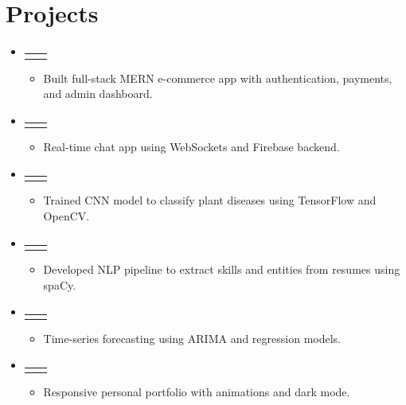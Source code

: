 \documentclass[a4paper,10pt]{article}
\makeatletter
\newcommand{\resumeItem}[1]{
  \item\small{#1 \vspace{-2pt}}
}
\newcommand{\resumeProjectHeading}[2]{
  \vspace{-1pt}\item
    \begin{tabular*}{0.97\textwidth}{l@{\extracolsep{\fill}}r}
      \textbf{#1} & \textit{\small#2} \\
    \end{tabular*}\vspace{-5pt}
}
\newcommand{\resumeSubHeadingListStart}{\begin{itemize}[leftmargin=0.15in, label={}]}
\newcommand{\resumeSubHeadingListEnd}{\end{itemize}}
\newcommand{\resumeItemListStart}{\begin{itemize}[leftmargin=0.2in]}
\newcommand{\resumeItemListEnd}{\end{itemize}\vspace{-5pt}}
\makeatother
\begin{document}
\section{Projects}
\resumeSubHeadingListStart
  \resumeProjectHeading
    {}{}
        \resumeItemListStart
            \resumeItem{Built full-stack MERN e-commerce app with authentication, payments, and admin dashboard.}
          \resumeItemListEnd
      \resumeProjectHeading
    {}{}
        \resumeItemListStart
            \resumeItem{Real-time chat app using WebSockets and Firebase backend.}
          \resumeItemListEnd
      \resumeProjectHeading
    {}{}
        \resumeItemListStart
            \resumeItem{Trained CNN model to classify plant diseases using TensorFlow and OpenCV.}
          \resumeItemListEnd
      \resumeProjectHeading
    {}{}
        \resumeItemListStart
            \resumeItem{Developed NLP pipeline to extract skills and entities from resumes using spaCy.}
          \resumeItemListEnd
      \resumeProjectHeading
    {}{}
        \resumeItemListStart
            \resumeItem{Time-series forecasting using ARIMA and regression models.}
          \resumeItemListEnd
      \resumeProjectHeading
    {}{}
        \resumeItemListStart
            \resumeItem{Responsive personal portfolio with animations and dark mode.}
          \resumeItemListEnd
    \resumeSubHeadingListEnd
\vspace{4pt}


\end{document}
